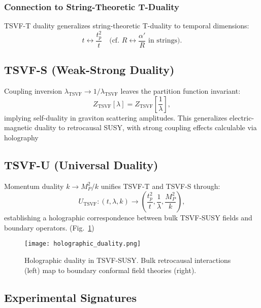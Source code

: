 \documentclass[twocolumn,superscriptaddress,floatfix]{revtex4-2}
\begin{document}
\subsubsection{Connection to String-Theoretic T-Duality}  
TSVF-T duality generalizes string-theoretic T-duality \cite{Polchinski1998} to temporal dimensions:  
\begin{equation}  
t \leftrightarrow \frac{t_p^2}{t} \quad \text{(cf. } R \leftrightarrow \frac{\alpha'}{R} \text{ in strings)}.  
\end{equation}  

\subsection{TSVF-S (Weak-Strong Duality)}  
\label{subsec:s_duality}  

Coupling inversion \( \lambda_{\text{TSVF}} \to 1/\lambda_{\text{TSVF}} \) leaves the partition function invariant:  
\begin{equation}  
Z_{\text{TSVF}}[\lambda] = Z_{\text{TSVF}}\!\left[\frac{1}{\lambda}\right],  
\label{eq:s_duality}  
\end{equation}  
implying self-duality in graviton scattering amplitudes. This generalizes electric-magnetic duality \cite{Montonen1977} to retrocausal SUSY, with strong coupling effects calculable via holography

\subsection{TSVF-U (Universal Duality)}  
\label{subsec:u_duality}  

Momentum duality $k \to M_P^2/k$ unifies TSVF-T and TSVF-S through:
\begin{equation}
U_{\text{TSVF}}: (t, \lambda, k) \rightarrow \left(\frac{t_p^2}{t}, \frac{1}{\lambda}, \frac{M_P^2}{k}\right),
\end{equation}
establishing a holographic correspondence between bulk TSVF-SUSY fields and boundary operators.  (Fig.~\ref{fig:holography})

\begin{figure}[htbp]  
\centering  
\texttt{[image: holographic\_duality.png]}  
\caption{Holographic duality in TSVF-SUSY. Bulk retrocausal interactions (left) map to boundary conformal field theories (right).}  
\label{fig:holography}  
\end{figure}  

\subsection{Experimental Signatures}  
\label{subsec:duality_signatures}  
\end{document}
